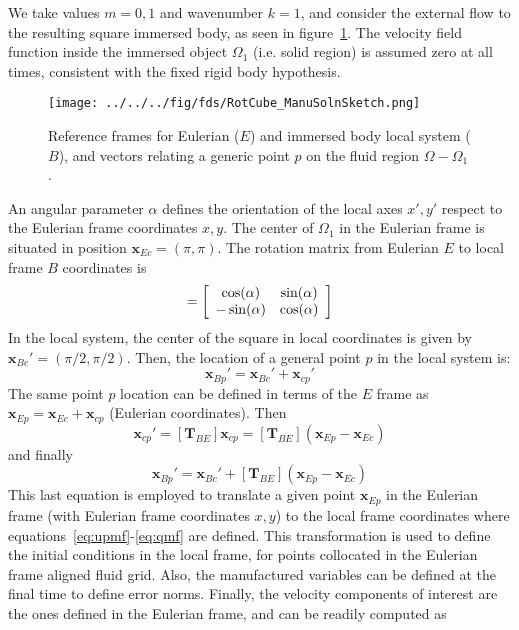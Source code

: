 \documentclass[12pt]{article}
\begin{document}
We take values $m=0,1$ and wavenumber $k=1$, and consider the external flow to the resulting square immersed body, as seen in figure~\ref{Fig:ManuSoln}. The velocity field function inside the immersed object $\Omega_1$ (i.e. solid region) is assumed zero at all times, consistent with the fixed rigid body hypothesis.
%
\begin{figure}[h]
      \centering
      \texttt{[image: ../../../fig/fds/RotCube\_ManuSolnSketch.png]}
      \caption{Reference frames for Eulerian ($E$) and immersed body local system ($B$), and vectors relating a generic point $p$ on the fluid region $\Omega-\Omega_1$.}
	\label{Fig:ManuSoln}
\end{figure}
%
An angular parameter $\alpha$ defines the orientation of the local axes $x',y'$ respect to the Eulerian frame coordinates $x,y$. The center of $\Omega_1$ in the Eulerian frame is situated in position $\mathbf{x}_{Ec}=(\pi,\pi)$. The rotation matrix from Eulerian $E$ to local frame $B$ coordinates is
%
\begin{equation}
  [\mathbf{T}_{BE}] = \left[ \begin{array}{c c}
                                          \cos(\alpha) & \sin(\alpha) \\
                                         -\sin(\alpha)  & \cos(\alpha) \end{array} \right]
\end{equation}
%
In the local system, the center of the square in local coordinates is given by $\mathbf{x}_{Bc}'=(\pi/2,\pi/2)$. Then, the location of a general point $p$ in the local system is:
%
\begin{equation}
    \mathbf{x}_{Bp}'= \mathbf{x}_{Bc}' +\mathbf{x}_{cp}'
\end{equation}
%
The same point $p$ location can be defined in terms of the $E$ frame as $\mathbf{x}_{Ep}= \mathbf{x}_{Ec} +\mathbf{x}_{cp}$ (Eulerian coordinates). Then
%
\begin{equation}
    \mathbf{x}_{cp}'=[\mathbf{T}_{BE}] \mathbf{x}_{cp}=[\mathbf{T}_{BE}] \left( \mathbf{x}_{Ep} - \mathbf{x}_{Ec} \right)
\end{equation}
%
and finally
%
\begin{equation}
    \mathbf{x}_{Bp}'= \mathbf{x}_{Bc}' +[\mathbf{T}_{BE}] \left( \mathbf{x}_{Ep} - \mathbf{x}_{Ec} \right)
\end{equation}
%
This last equation is employed to translate a given point $\mathbf{x}_{Ep}$ in the Eulerian frame (with Eulerian frame coordinates $x,y$) to the local frame coordinates where equations~\eqref{eq:upmf}-\eqref{eq:qmf} are defined. This transformation is used to define the initial conditions in the local frame, for points collocated in the Eulerian frame aligned fluid grid. Also, the manufactured variables can be defined at the final time to define error norms. Finally, the velocity components of interest are the ones defined in the Eulerian frame, and can be readily computed as
\end{document}
